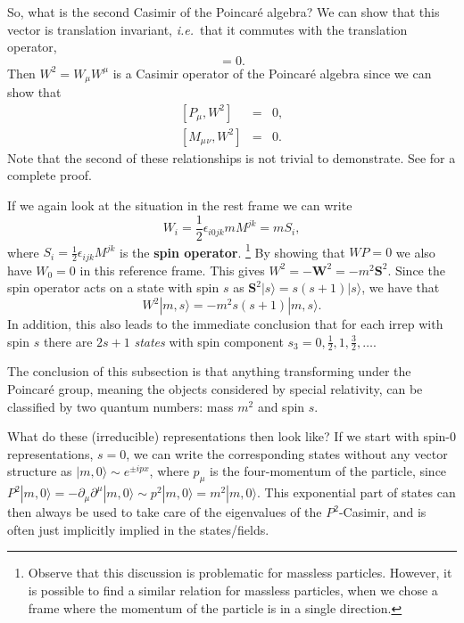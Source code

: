\documentclass[notes.tex]{subfiles}
\begin{document}
So, what is the second Casimir of the Poincaré algebra?
We can show that this vector is translation invariant, {\it i.e.}\ that it commutes with the translation operator,
\begin{equation}
[P_\mu, W_\nu]=0.
\label{eq:PW_commutator}
\end{equation}
Then $W^2 = W_\mu W^\mu$ is a Casimir operator of the Poincaré algebra since we can show that
\begin{eqnarray}
\left[P_\mu, W^2\right] &=& 0,\\
\left[M_\mu{}_\nu, W^2\right] &=& 0.
\end{eqnarray}
Note that the second of these relationships is not trivial to demonstrate. See \cite{IntrSUSY2010} for a complete proof.

If we again look at the situation in the rest frame we can write 
\begin{equation}W_i = \frac{1}{2} \epsilon_{i 0 jk}m M^{jk} = mS_i,
\label{eq:PL_restframe}
\end{equation}
where $S_i = \frac{1}{2} \epsilon_{ijk} M^{jk}$ is the {\bf spin operator}. \footnote{Observe that this discussion is problematic for massless particles. However, it is possible to find a similar relation for massless particles, when we chose a frame where the momentum of the particle is in a single direction.}
By showing that $WP=0$ we also have $W_0 = 0$ in this reference frame. This gives $W^2 = -\mathbf W^2 = -m^2\mathbf S^2$. Since the spin operator acts on a state with spin $s$ as $\mathbf S^2| s\rangle=s(s+1)| s\rangle$, we have that
\[W^2|m,s\rangle = -m^2 s(s+1)|m,s\rangle.\]
In addition, this also leads to the immediate conclusion that for each irrep with spin $s$ there are $2s+1$ {\it states} with spin component $s_3=0,\frac{1}{2},1,\frac{3}{2},\ldots$.

The conclusion of this subsection is that anything transforming under the Poincaré group, meaning the objects considered by special relativity, can be classified by two quantum numbers: mass $m^2$ and spin $s$.

What do these (irreducible) representations then look like? If we start with spin-0 representations, $s=0$, we can write the corresponding states without any vector structure as $|m,0\rangle\sim e^{\pm ipx}$, where $p_\mu$ is the four-momentum of the particle, since $P^2|m,0\rangle=-\partial_\mu\partial^\mu|m,0\rangle\sim p^2|m,0\rangle=m^2|m,0\rangle$. This exponential part of states can then always be used to take care of the eigenvalues of the $P^2$-Casimir, and is often just implicitly implied in the states/fields.
\end{document}
